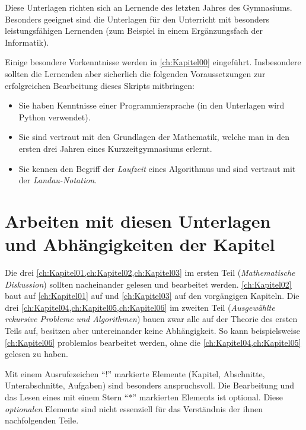 Diese Unterlagen richten sich an Lernende des letzten Jahres des Gymnasiums. Besonders geeignet sind die Unterlagen für den Unterricht mit besonders leistungsfähigen Lernenden (zum Beispiel in einem Ergänzungsfach der Informatik).

Einige besondere Vorkenntnisse werden in \cref{ch:Kapitel00} eingeführt. Insbesondere sollten die Lernenden aber sicherlich die folgenden Voraussetzungen zur erfolgreichen Bearbeitung dieses Skripts mitbringen:
\begin{itemize}
	\item Sie haben Kenntnisse einer Programmiersprache (in den Unterlagen wird Python verwendet).
	\item Sie sind vertraut mit den Grundlagen der Mathematik, welche man in den ersten drei Jahren eines Kurzzeitgymnasiums erlernt.
	\item Sie kennen den Begriff der \textit{Laufzeit} eines Algorithmus und sind vertraut mit der \textit{Landau-Notation}.
\end{itemize}

\section*{Arbeiten mit diesen Unterlagen und Abhängigkeiten der Kapitel}
Die drei \cref{ch:Kapitel01,ch:Kapitel02,ch:Kapitel03} im ersten Teil (\textit{Mathematische Diskussion}) sollten nacheinander gelesen und bearbeitet werden. \cref{ch:Kapitel02} baut auf \cref{ch:Kapitel01} auf und \cref{ch:Kapitel03} auf den vorgängigen Kapiteln. Die drei \cref{ch:Kapitel04,ch:Kapitel05,ch:Kapitel06} im zweiten Teil (\textit{Ausgewählte rekursive Probleme und Algorithmen}) bauen zwar alle auf der Theorie des ersten Teils auf, besitzen aber untereinander keine Abhängigkeit. So kann beispielsweise \cref{ch:Kapitel06} problemlos bearbeitet werden, ohne die \cref{ch:Kapitel04,ch:Kapitel05} gelesen zu haben.

Mit einem Ausrufezeichen \enquote{!} markierte Elemente (Kapitel, Abschnitte, Unterabschnitte, Aufgaben) sind besonders anspruchsvoll. Die Bearbeitung und das Lesen eines mit einem Stern \enquote{*} markierten Elements ist optional. Diese \textit{optionalen} Elemente sind nicht essenziell für das Verständnis der ihnen nachfolgenden Teile.

